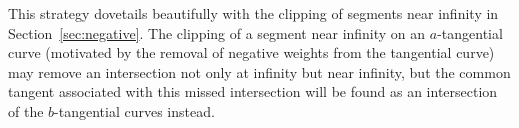 This strategy dovetails beautifully 
with the clipping of segments near infinity in Section~\ref{sec:negative}.
The clipping of a segment near infinity on an $a$-tangential curve
(motivated by the removal of negative weights from the tangential curve)
may remove an intersection not only at infinity but near infinity,
but the common tangent associated with this missed intersection
will be found as an intersection of the $b$-tangential curves instead.

